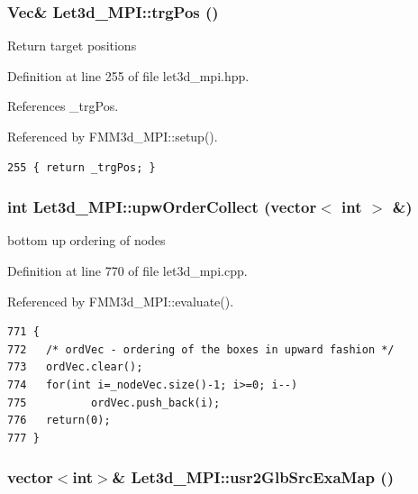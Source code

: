 \subsubsection{\setlength{\rightskip}{0pt plus 5cm}Vec\& Let3d\_\-MPI::trg\-Pos ()\hspace{0.3cm}{\tt  [inline]}}\label{classLet3d__MPI_7dc770563c182703b1986abb06c6dbbd_7dc770563c182703b1986abb06c6dbbd}


Return target positions 

Definition at line 255 of file let3d\_\-mpi.hpp.

References \_\-trg\-Pos.

Referenced by FMM3d\_\-MPI::setup().

\footnotesize\begin{verbatim}255 { return _trgPos; }
\end{verbatim}\normalsize 


\subsubsection{\setlength{\rightskip}{0pt plus 5cm}int Let3d\_\-MPI::upw\-Order\-Collect (vector$<$ int $>$ \&)}\label{classLet3d__MPI_1382847d0f42ddbbb82aef15511dc135_1382847d0f42ddbbb82aef15511dc135}


bottom up ordering of nodes 

Definition at line 770 of file let3d\_\-mpi.cpp.

Referenced by FMM3d\_\-MPI::evaluate().

\footnotesize\begin{verbatim}771 {
772   /* ordVec - ordering of the boxes in upward fashion */
773   ordVec.clear();
774   for(int i=_nodeVec.size()-1; i>=0; i--)
775          ordVec.push_back(i);
776   return(0);
777 }
\end{verbatim}\normalsize 


\subsubsection{\setlength{\rightskip}{0pt plus 5cm}vector$<$int$>$\& Let3d\_\-MPI::usr2Glb\-Src\-Exa\-Map ()\hspace{0.3cm}{\tt  [inline]}}\label{classLet3d__MPI_28d0f9cdcc32c6ec5209c00feb44ae97_28d0f9cdcc32c6ec5209c00feb44ae97}


